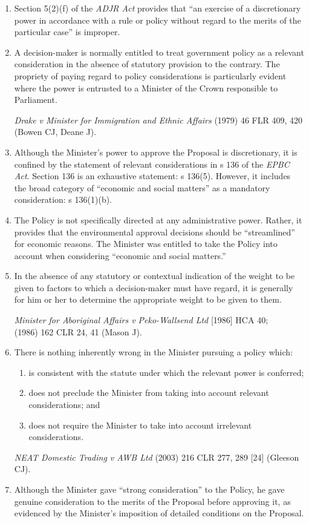\documentclass[12pt]{article}
\begin{document}
\begin{enumerate}[1.]
\item
  Section 5(2)(f) of the \emph{ADJR Act} provides that ``an exercise of
  a discretionary power in accordance with a rule or policy without
  regard to the merits of the particular case'' is improper.
\item
  A decision-maker is normally entitled to treat government policy as a
  relevant consideration in the absence of statutory provision to the
  contrary. The propriety of paying regard to policy considerations is
  particularly evident where the power is entrusted to a Minister of the
  Crown responsible to Parliament.

  \emph{Drake v Minister for Immigration and Ethnic Affairs} (1979) 46
  FLR 409, 420 \\(Bowen CJ, Deane J).
\item
  Although the Minister's power to approve the Proposal is
  discretionary, it is confined by the statement of relevant
  considerations in s 136 of the \emph{EPBC Act}. Section 136 is an
  exhaustive statement: s 136(5). However, it includes the broad
  category of ``economic and social matters'' as a mandatory
  consideration: s 136(1)(b).
\item
  The Policy is not specifically directed at any administrative power.
  Rather, it provides that the environmental approval decisions should
  be ``streamlined'' for economic reasons. The Minister was entitled to
  take the Policy into account when considering ``economic and social
  matters.''
\item
  In the absence of any statutory or contextual indication of the weight
  to be given to factors to which a decision-maker must have regard, it
  is generally for him or her to determine the appropriate weight to be
  given to them.

  \emph{Minister for Aboriginal Affairs v Peko-Wallsend Ltd} {[}1986{]}
  HCA 40; \\(1986) 162 CLR 24, 41 (Mason J).
\item
  There is nothing inherently wrong in the Minister pursuing a policy
  which:

  \begin{enumerate}
  \item
    is consistent with the statute under which the relevant power is
    conferred;
  \item
    does not preclude the Minister from taking into account relevant
    considerations; and
  \item
    does not require the Minister to take into account irrelevant
    considerations.
  \end{enumerate}

  \emph{NEAT Domestic Trading v AWB Ltd} (2003) 216 CLR 277, 289
  {[}24{]} (Gleeson CJ).
\item
  Although the Minister gave ``strong consideration'' to the Policy, he
  gave genuine consideration to the merits of the Proposal before
  approving it, as evidenced by the Minister's imposition of detailed
  conditions on the Proposal.
\end{enumerate}
\end{document}
